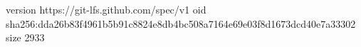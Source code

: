 version https://git-lfs.github.com/spec/v1
oid sha256:dda26b83f4961b5b91c8824e8db4bc508a7164e69e03f8d1673dcd40e7a33302
size 2933
